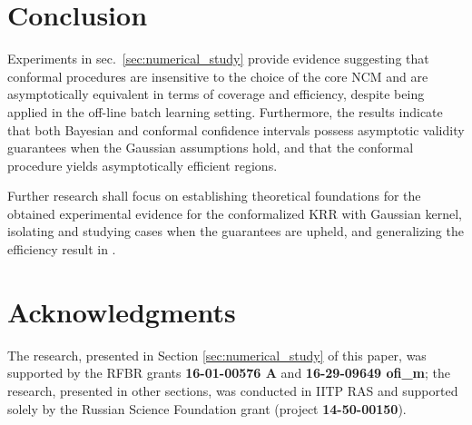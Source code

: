 \documentclass[10pt, conference, compsocconf]{IEEEtran}
\begin{document}


\section{Conclusion} %
\label{sec:conclusion}

Experiments in sec.~\ref{sec:numerical_study} provide evidence suggesting that
conformal procedures are insensitive to the choice of the core NCM and are asymptotically
equivalent in terms of coverage and efficiency, despite being applied in the off-line
batch learning setting. Furthermore, the results indicate that both Bayesian and
conformal confidence intervals possess asymptotic validity guarantees when the
Gaussian assumptions hold, and that the conformal procedure yields asymptotically
efficient regions.

Further research shall focus on establishing theoretical foundations for the obtained
experimental evidence for the conformalized KRR with Gaussian kernel, isolating and
studying cases when the guarantees are upheld, and generalizing the efficiency result
in \cite{burnaevV14}.


\section*{Acknowledgments} %
\label{sec:acknowledgments}
\noindent The research, presented in Section \ref{sec:numerical_study} of this paper,
was supported by the RFBR grants \textbf{16-01-00576 A} and \textbf{16-29-09649 ofi\_m};
the research, presented in other sections, was conducted in IITP RAS and supported
solely by the Russian Science Foundation grant (project \textbf{14-50-00150}).



\def\IEEEbibitemsep{6pt}

\end{document}
